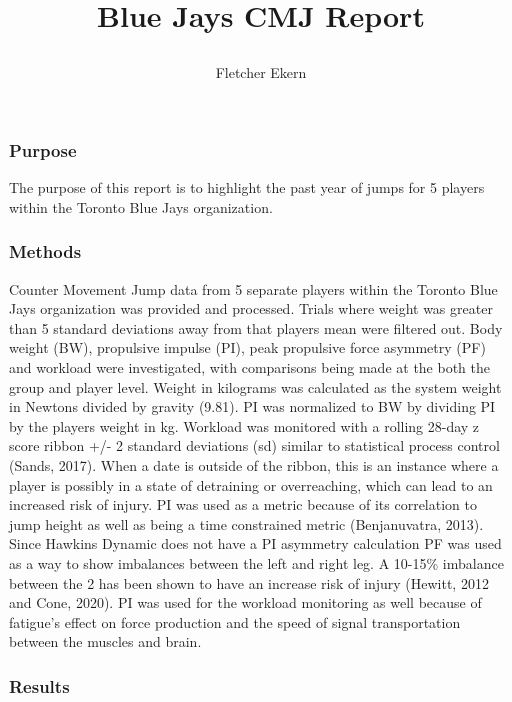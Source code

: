 \documentclass[
  12pt,
]{article}
\title{\vspace{-3.5cm}

Blue Jays CMJ Report}
\author{Fletcher Ekern}
\date{}
\begin{document}
\maketitle

\hypertarget{purpose}{%
\subsubsection{Purpose}\label{purpose}}

The purpose of this report is to highlight the past year of jumps for 5
players within the Toronto Blue Jays organization.

\hypertarget{methods}{%
\subsubsection{Methods}\label{methods}}

Counter Movement Jump data from 5 separate players within the Toronto
Blue Jays organization was provided and processed. Trials where weight
was greater than 5 standard deviations away from that players mean were
filtered out. Body weight (BW), propulsive impulse (PI), peak propulsive
force asymmetry (PF) and workload were investigated, with comparisons
being made at the both the group and player level. Weight in kilograms
was calculated as the system weight in Newtons divided by gravity
(9.81). PI was normalized to BW by dividing PI by the players weight in
kg. Workload was monitored with a rolling 28-day z score ribbon +/- 2
standard deviations (sd) similar to statistical process control (Sands,
2017). When a date is outside of the ribbon, this is an instance where a
player is possibly in a state of detraining or overreaching, which can
lead to an increased risk of injury. PI was used as a metric because of
its correlation to jump height as well as being a time constrained
metric (Benjanuvatra, 2013). Since Hawkins Dynamic does not have a PI
asymmetry calculation PF was used as a way to show imbalances between
the left and right leg. A 10-15\% imbalance between the 2 has been shown
to have an increase risk of injury (Hewitt, 2012 and Cone, 2020). PI was
used for the workload monitoring as well because of fatigue's effect on
force production and the speed of signal transportation between the
muscles and brain.

\hypertarget{results}{%
\subsubsection{Results}\label{results}}
\end{document}
